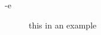 -e \begin{figure}[htb]
       \begin{center}
               \scalebox{0.9}{
                        \nonstopmode
                        
                        \errorstopmode
                        \rule[-0.5cm]{0cm}{0cm}}
                \caption{this in an example}
        \end{center}
\end{figure}

